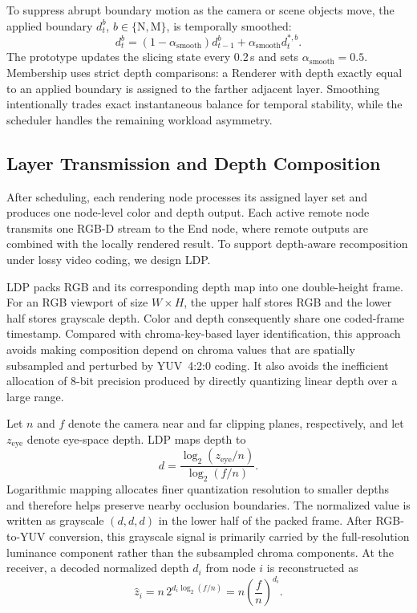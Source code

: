 \documentclass[10pt,journal,compsoc]{IEEEtran}
\begin{document}
To suppress abrupt boundary motion as the camera or scene objects move, the applied boundary $d_t^b$, $b\in\{\mathrm{N},\mathrm{M}\}$, is temporally smoothed:
\begin{equation}
	d_t^b=(1-\alpha_{\mathrm{smooth}})d_{t-1}^b
	+\alpha_{\mathrm{smooth}}d_t^{*,b}.
\end{equation}
The prototype updates the slicing state every 0.2\,s and sets $\alpha_{\mathrm{smooth}}=0.5$. Membership uses strict depth comparisons: a Renderer with depth exactly equal to an applied boundary is assigned to the farther adjacent layer. Smoothing intentionally trades exact instantaneous balance for temporal stability, while the scheduler handles the remaining workload asymmetry.

\subsection{Layer Transmission and Depth Composition}
\label{sec:compositing}

After scheduling, each rendering node processes its assigned layer set and produces one node-level color and depth output. Each active remote node transmits one RGB-D stream to the End node, where remote outputs are combined with the locally rendered result. To support depth-aware recomposition under lossy video coding, we design LDP.

LDP packs RGB and its corresponding depth map into one double-height frame. For an RGB viewport of size $W\times H$, the upper half stores RGB and the lower half stores grayscale depth. Color and depth consequently share one coded-frame timestamp. Compared with chroma-key-based layer identification, this approach avoids making composition depend on chroma values that are spatially subsampled and perturbed by YUV~4:2:0 coding. It also avoids the inefficient allocation of 8-bit precision produced by directly quantizing linear depth over a large range.

Let $n$ and $f$ denote the camera near and far clipping planes, respectively, and let $z_{\mathrm{eye}}$ denote eye-space depth. LDP maps depth to
\begin{equation}
	d=\frac{\log_2(z_{\mathrm{eye}}/n)}{\log_2(f/n)}.
	\label{eq:log_depth}
\end{equation}
Logarithmic mapping allocates finer quantization resolution to smaller depths and therefore helps preserve nearby occlusion boundaries. The normalized value is written as grayscale $(d,d,d)$ in the lower half of the packed frame. After RGB-to-YUV conversion, this grayscale signal is primarily carried by the full-resolution luminance component rather than the subsampled chroma components. At the receiver, a decoded normalized depth $d_i$ from node $i$ is reconstructed as
\begin{equation}
	\widehat z_i=n\,2^{d_i\log_2(f/n)}=n\left(\frac{f}{n}\right)^{d_i}.
\end{equation}
\end{document}
